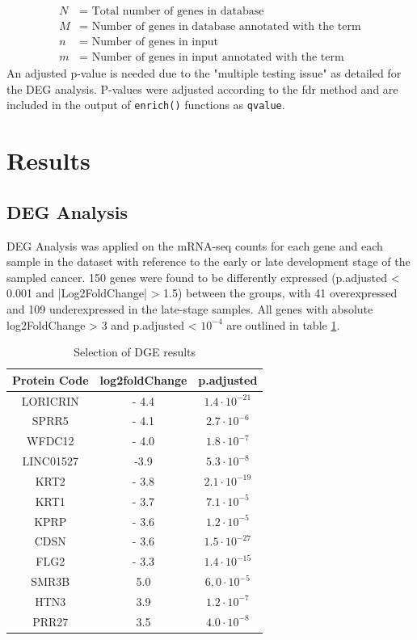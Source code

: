 \documentclass[twoside]{article}
\begin{document}
\[
\begin{array}{rl}
N & = \text{ Total number of genes in database} \\
M & = \text{ Number of genes in database annotated with the term} \\
n & = \text{ Number of genes in input} \\
m & = \text{ Number of genes in input annotated with the term}
\end{array}
\]
An adjusted p-value is needed due to the "multiple testing issue" as detailed for the DEG analysis. P-values were adjusted according to the fdr method and are included in the output of \texttt{enrich()} functions as \texttt{qvalue}.

\section{Results}
\subsection{DEG Analysis}

DEG Analysis was applied on the mRNA-seq counts for each gene and each sample in the dataset with reference to the early or late development stage of the sampled cancer. 150 genes were found to be differently expressed (p.adjusted < 0.001 and |Log2FoldChange| > 1.5) between the groups, with 41 overexpressed and 109 underexpressed in the late-stage samples. All genes with absolute log2FoldChange > 3 and  p.adjusted < $10^{-4}$ are outlined in table \ref{tab:DGE_results}.

\begin{table}[ht]
    \centering
    \begin{tabular}{c  |c  |c} 
          Protein Code&  log2foldChange&  p.adjusted  \\ \hline
          LORICRIN&  - 4.4&  $1.4 \cdot 10^{-21}$ \\
          SPRR5&  - 4.1& $2.7 \cdot 10^{-6}$  \\
         WFDC12 & - 4.0& $1.8 \cdot 10^{-7}$ \\
         LINC01527 & -3.9& $5.3 \cdot 10^{-8}$ \\
         KRT2 & - 3.8& $2.1 \cdot 10^{-19}$ \\
         KRT1 & - 3.7& $7.1 \cdot 10^{-5}$ \\
         KPRP & - 3.6& $1.2 \cdot 10^{-5}$ \\
         CDSN& - 3.6& $1.5 \cdot 10^{-27}$ \\
         FLG2 & - 3.3&$1.4 \cdot 10^{-15}$  \\\hline
         SMR3B & 5.0& $6,0 \cdot 10^{-5}$ \\
         HTN3 & 3.9& $1.2 \cdot 10^{-7}$ \\
         PRR27 & 3.5& $4.0 \cdot 10^{-8}$ \\
    \end{tabular}
    \caption{Selection of DGE results}
    \label{tab:DGE_results}
\end{table}
\end{document}
